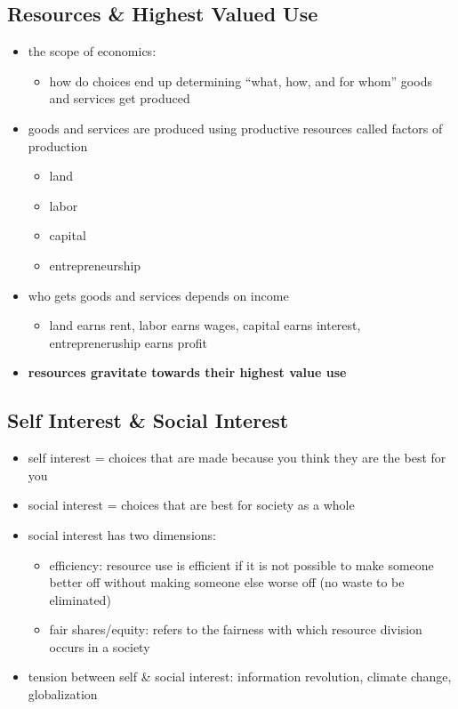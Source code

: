 \documentclass[11pt]{article}
\begin{document}
\subsection{Resources \& Highest Valued Use}
\label{sec:org676f19d}
\begin{itemize}
\item the scope of economics: 
\begin{itemize}
\item how do choices end up determining ``what, how, and for whom'' goods and services get produced
\end{itemize}
\item goods and services are produced using productive resources called factors of production
\begin{itemize}
\item land
\item labor
\item capital
\item entrepreneurship
\end{itemize}
\item who gets goods and services depends on income
\begin{itemize}
\item land earns rent, labor earns wages, capital earns interest, entrepreneruship earns profit
\end{itemize}
\item \textbf{\textbf{resources gravitate towards their highest value use}}
\end{itemize}
\subsection{Self Interest \& Social Interest}
\label{sec:orga7067bd}
\begin{itemize}
\item self interest = choices that are made because you think they are the best for you
\item social interest = choices that are best for society as a whole
\item social interest has two dimensions: 
\begin{itemize}
\item efficiency: resource use is efficient if it is not possible to make someone better off without
making someone else worse off (no waste to be eliminated)
\item fair shares/equity: refers to the fairness with which resource division occurs in a society
\end{itemize}
\item tension between self \& social interest: information revolution, climate change, globalization
\end{itemize}
\end{document}
